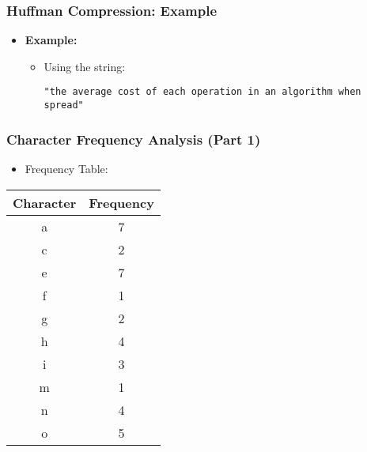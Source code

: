 \documentclass[10pt,aspectratio=43]{beamer}
\begin{document}
\begin{frame}
    \frametitle{\textcolor{myMaroon}{Huffman Compression: Example}}
    
    \begin{itemize}
        \item \textcolor{myMaroon}{\textbf{Example:}}
        
        \vspace{0.3cm}
        \begin{itemize}
            \item \textcolor{myBlue}{Using the string:}
            
            \begin{center}
                \texttt{"the average cost of each operation in an algorithm when spread"}
            \end{center}
        \end{itemize}
    \end{itemize}
\end{frame}






\begin{frame}
    \frametitle{\textcolor{myMaroon}{Character Frequency Analysis (Part 1)}}

    
 \begin{itemize}
     \item \textcolor{myMaroon}{Frequency Table:}
\end{itemize}
    \begin{center}
        \begin{tabular}{c c}
            \toprule
            \textcolor{myMaroon}{\textbf{Character}} & \textcolor{myMaroon}{\textbf{Frequency}} \\
            \midrule
            a & 7 \\
            c & 2 \\
            e & 7 \\
            f & 1 \\
            g & 2 \\
            h & 4 \\
            i & 3 \\
            m & 1 \\
            n & 4 \\
            o & 5 \\
            \bottomrule
        \end{tabular}
    \end{center}
\end{frame}
\end{document}

